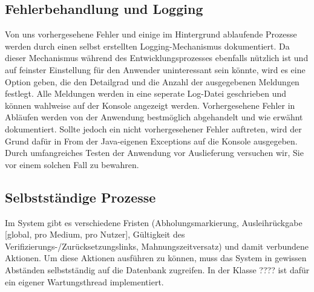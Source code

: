 \documentclass{article}
\begin{document}
\subsection{Fehlerbehandlung und Logging}
Von uns vorhergesehene Fehler und einige im Hintergrund ablaufende Prozesse werden durch einen selbst erstellten Logging-Mechanismus dokumentiert. Da dieser Mechanismus während des Entwicklungsprozesses ebenfalls nützlich ist und auf feinster Einstellung für den Anwender uninteressant sein könnte, wird es eine Option geben, die den Detailgrad und die Anzahl der ausgegebenen Meldungen festlegt. Alle Meldungen werden in eine seperate Log-Datei geschrieben und können wahlweise auf der Konsole angezeigt werden. Vorhergesehene Fehler in Abläufen werden von der Anwendung bestmöglich abgehandelt und wie erwähnt dokumentiert. Sollte jedoch ein nicht vorhergesehener Fehler auftreten, wird der Grund dafür in From der Java-eigenen Exceptions auf die Konsole ausgegeben. Durch umfangreiches Testen der Anwendung vor Auslieferung versuchen wir, Sie vor einem solchen Fall zu bewahren.
\subsection{Selbstständige Prozesse}
Im System gibt es verschiedene Fristen (Abholungsmarkierung, Ausleihrückgabe [global, pro Medium, pro Nutzer], Gültigkeit des Verifizierungs-/Zurücksetzungslinks, Mahnungszeitversatz) und damit verbundene Aktionen. Um diese Aktionen ausführen zu können, muss das System in gewissen Abständen selbstständig auf die Datenbank zugreifen. In der Klasse ???? ist dafür ein eigener Wartungsthread implementiert.
\end{document}
